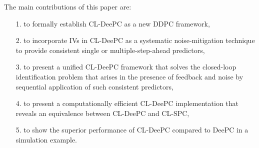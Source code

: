 The main contributions of this paper are: 
\begin{enumerate}%
\item[1.] to formally establish \acf{CL-DeePC} as a new \ac{DDPC} framework, \label{contribution:develop_CL_DeePC}
\item[2.] to incorporate \ac{IVs} in \ac{CL-DeePC} as a systematic noise-mitigation technique to provide consistent single or multiple-step-ahead predictors, \label{contribution:incorporate_IVs}
\item[3.] to present a unified \ac{CL-DeePC} framework that solves the closed-loop identification problem that arises in the presence of feedback and noise by sequential application of such consistent predictors,\label{contribution:solves_CL_issue}
\item[4.] to present a computationally efficient \ac{CL-DeePC} implementation that reveals an equivalence between \ac{CL-DeePC} and \ac{CL-SPC},
\item[5.] to show the superior performance of \ac{CL-DeePC} compared to \ac{DeePC} in a simulation example.
\end{enumerate}
%

